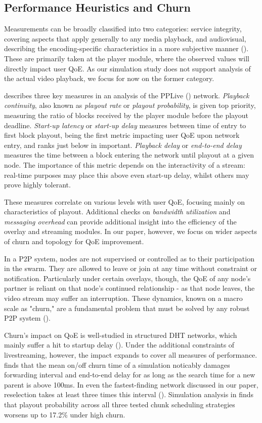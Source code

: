 \documentclass[12pt,a4paper]{article}
\begin{document}
\subsection{Performance Heuristics and Churn} \label{litreview:heuristics}
Measurements can be broadly classified into two categories: service integrity, covering aspects that apply generally to any media playback, and audiovisual, describing the encoding-specific characteristics in a more subjective manner (\cite{Moltchanov2011}). These are primarily taken at the player module, where the observed values will directly impact user QoE. As our simulation study does not support analysis of the actual video playback, we focus for now on the former category.

\cite{Hei2007} describes three key measures in an analysis of the PPLive (\cite{PPLive}) network. \textit{Playback continuity}, also known as \textit{playout rate} or \textit{playout probability}, is given top priority, measuring the ratio of blocks received by the player module before the playout deadline. \textit{Start-up latency} or \textit{start-up delay} measures between time of entry to first block playout, being the first metric impacting user QoE upon network entry, and ranks just below in important. \textit{Playback delay} or \textit{end-to-end delay} measures the time between a block entering the network until playout at a given node. The importance of this metric depends on the interactivity of a stream: real-time purposes may place this above even start-up delay, whilst others may prove highly tolerant.

These measures correlate on various levels with user QoE, focusing mainly on characteristics of playout. Additional checks on \textit{bandwidth utilization} and \textit{messaging overhead} can provide additional insight into the efficiency of the overlay and streaming modules. In our paper, however, we focus on wider aspects of churn and topology for QoE improvement.

In a P2P system, nodes are not supervised or controlled as to their participation in the swarm. They
are allowed to leave or join at any time without constraint or notification. Particularly
under certain overlays, though, the QoE of any node's partner is reliant on that node's continued relationship - as that node leaves, the
video stream may suffer an interruption. These dynamics, known on a macro scale as
"churn," are a fundamental problem that must be solved by any robust P2P system (\cite{Stutzbach2004}).

Churn's impact on QoE is well-studied in structured DHT networks, which mainly suffer a hit to startup delay (\cite{Ho2013}). Under the additional constraints of livestreaming, however, the impact expands to cover all measures of performance. \cite{Nanao2012} finds that the mean on/off churn time of a simulation noticably damages forwarding interval and end-to-end delay for as long as the search time for a new parent is above 100ms. In even the fastest-finding network discussed in our paper, reselection takes at least three times this interval (\cite{Sina2020}). Simulation analysis in \cite{Kang2012} finds that playout probability across all three tested chunk scheduling strategies worsens up to 17.2\% under high churn.
\end{document}
